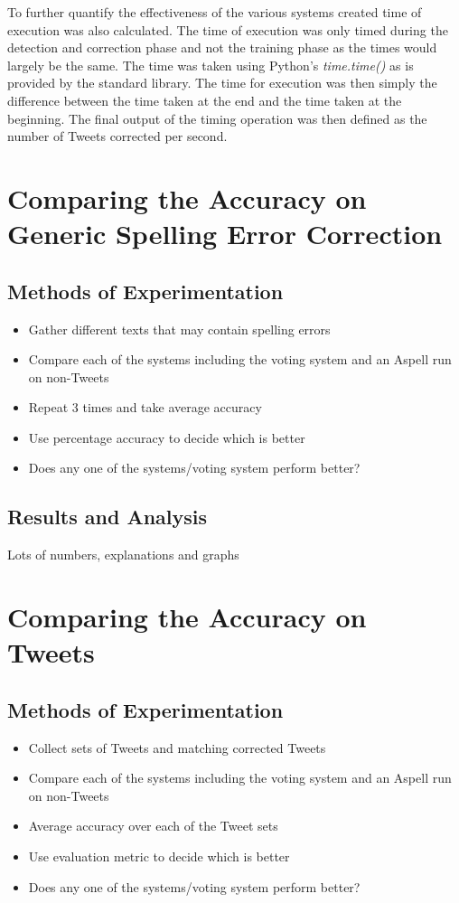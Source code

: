 To further quantify the effectiveness of the various systems created time of execution was also calculated. The time of execution was only timed during the detection and correction phase and not the training phase as the times would largely be the same. The time was taken using Python's \emph{time.time()} \cite{} as is provided by the standard library. The time for execution was then simply the difference between the time taken at the end and the time taken at the beginning. The final output of the timing operation was then defined as the number of Tweets corrected per second.

\section{Comparing the Accuracy on Generic Spelling Error Correction}

\subsection{Methods of Experimentation}
\begin{itemize}
	\item Gather different texts that may contain spelling errors
	\item Compare each of the systems including the voting system and an Aspell run on non-Tweets
	\item Repeat 3 times and take average accuracy
	\item Use percentage accuracy to decide which is better
	\item Does any one of the systems/voting system perform better?
\end{itemize}

\subsection{Results and Analysis}
Lots of numbers, explanations and graphs

\section{Comparing the Accuracy on Tweets}
\subsection{Methods of Experimentation}
\begin{itemize}
	\item Collect sets of Tweets and matching corrected Tweets
	\item Compare each of the systems including the voting system and an Aspell run on non-Tweets
	\item Average accuracy over each of the Tweet sets
	\item Use evaluation metric to decide which is better
	\item Does any one of the systems/voting system perform better?
\end{itemize}

